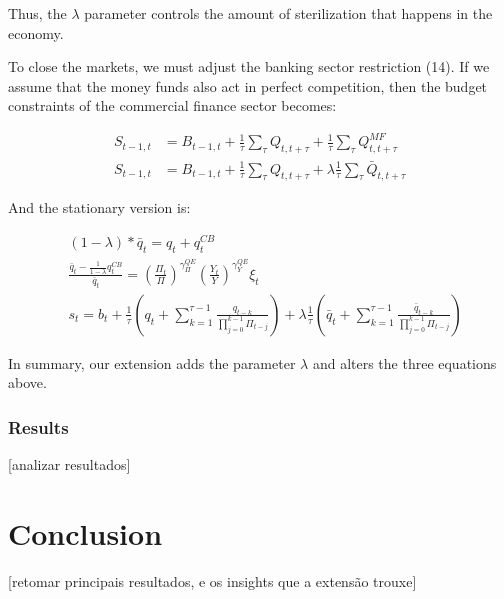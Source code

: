 \documentclass[12pt]{article}
\begin{document}
Thus, the $\lambda$ parameter controls the amount of sterilization that happens in the economy.

To close the markets, we must adjust the banking sector restriction (14). If we assume that the money funds also act in perfect competition, then the budget constraints of the commercial finance sector becomes:

\begin{align*}
S_{t-1,t} &= B_{t-1,t} + \frac{1}{\tau}\sum_\tau Q_{t,t+\tau} + \frac{1}{\tau}\sum_\tau Q^{MF}_{t,t+\tau}\\
S_{t-1,t} &= B_{t-1,t} + \frac{1}{\tau}\sum_\tau Q_{t,t+\tau} + \lambda\frac{1}{\tau}\sum_\tau \bar{Q}_{t,t+\tau}
\end{align*}

And the stationary version is:

\begin{align*}
&(1-\lambda) * \bar{q}_t = q_t + q^{CB}_t \tag{B.15'}\\
&\frac{\bar q_{t} - \frac{1}{1-\lambda}q^{CB}_{t}}{\bar q_{t}} = \left(\frac{\Pi_t}{\Pi}\right)^{\gamma^{QE}_\Pi}\left(\frac{Y_t}{Y}\right)^{\gamma^{QE}_Y}\xi_t \tag{B.14'}\\
&s_{t} = b_t + \frac{1}{\tau}\left(q_t + \sum_{k = 1}^{\tau - 1} \frac{q_{t-k}}{\prod_{j=0}^{k-1}\Pi_{t-j}}\right) + \lambda\frac{1}{\tau}\left(\bar{q}_t + \sum_{k = 1}^{\tau - 1} \frac{\bar{q}_{t-k}}{\prod_{j=0}^{k-1}\Pi_{t-j}}\right) \tag{B.7'}
\end{align*}

In summary, our extension adds the parameter $\lambda$ and alters the three equations above.




\subsubsection{Results}

[analizar resultados]



\section{Conclusion}

[retomar principais resultados, e os insights que a extensão trouxe]
\end{document}
